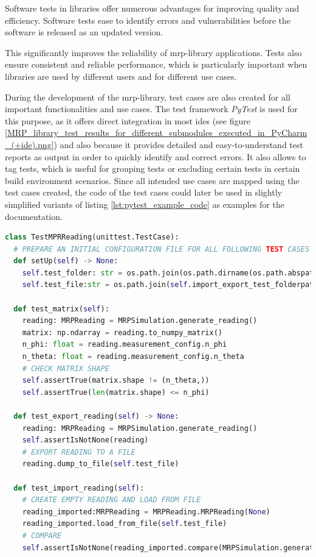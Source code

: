 Software tests in libraries offer numerous advantages for improving
quality and efficiency. Software tests ease to identify errors and
vulnerabilities before the software is released as an updated version.

This significantly improves the reliability of \gls{mrp}-library
applications. Tests also ensure consistent and reliable performance,
which is particularly important when libraries are used by different
users and for different use cases.

During the development of the \gls{mrp}-library, test cases are also
created for all important functionalities and use cases. The test
framework \emph{PyTest}  is used for this purpose, as it
offers direct integration in most \gls{ide}s (see figure
\ref{MRP_library_test_results_for_different_submodules_executed_in_PyCharm_(+ide).png})
and also because it provides detailed and easy-to-understand test
reports as output in order to quickly identify and correct errors. It
also allows to tag tests, which is useful for grouping tests or
excluding certain tests in certain build environment scenarios. Since
all intended use cases are mapped using the test cases created, the code
of the test cases could later be used in slightly simplified variants of
listing \ref{lst:pytest_example_code} as examples for the documentation.

\begin{lstlisting}[language=Python, caption={Example pytest class for testing MRPReading module functions}, label=lst:pytest_example_code]
class TestMPRReading(unittest.TestCase):
  # PREPARE AN INITIAL CONFIGURATION FILE FOR ALL FOLLOWING TEST CASES IN THIS FILE
  def setUp(self) -> None:
    self.test_folder: str = os.path.join(os.path.dirname(os.path.abspath(__file__)), "tmp")
    self.test_file:str = os.path.join(self.import_export_test_folderpath, "tmp")

  def test_matrix(self):
    reading: MRPReading = MRPSimulation.generate_reading()
    matrix: np.ndarray = reading.to_numpy_matrix()
    n_phi: float = reading.measurement_config.n_phi
    n_theta: float = reading.measurement_config.n_theta
    # CHECK MATRIX SHAPE
    self.assertTrue(matrix.shape != (n_theta,))
    self.assertTrue(len(matrix.shape) <= n_phi)

  def test_export_reading(self) -> None:
    reading: MRPReading = MRPSimulation.generate_reading()
    self.assertIsNotNone(reading)
    # EXPORT READING TO A FILE
    reading.dump_to_file(self.test_file)

  def test_import_reading(self):
    # CREATE EMPTY READING AND LOAD FROM FILE
    reading_imported:MRPReading = MRPReading.MRPReading(None)
    reading_imported.load_from_file(self.test_file)
    # COMPARE
    self.assertIsNotNone(reading_imported.compare(MRPSimulation.generate_reading()))
\end{lstlisting}

